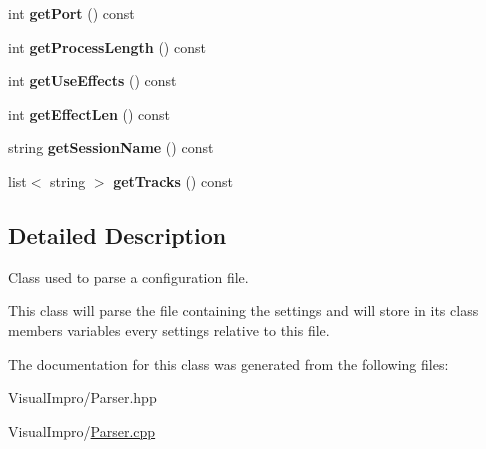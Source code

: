 \begin{DoxyCompactItemize}
int {\bfseries get\+Port} () const
\item 
\mbox{\label{class_parser_a3296d97b8059d1a01ee596f0a3bceaa0}} 
int {\bfseries get\+Process\+Length} () const
\item 
\mbox{\label{class_parser_ad93fcedcca9ed65c9a532da3967524da}} 
int {\bfseries get\+Use\+Effects} () const
\item 
\mbox{\label{class_parser_a01da8b67e24a7ad6c67c4bf25d1b2839}} 
int {\bfseries get\+Effect\+Len} () const
\item 
\mbox{\label{class_parser_a67ce7c654b1fb21ae9288140ec2d6ffc}} 
string {\bfseries get\+Session\+Name} () const
\item 
\mbox{\label{class_parser_a60a3afb113f15d798e604da6752ba1a7}} 
list$<$ string $>$ {\bfseries get\+Tracks} () const
\end{DoxyCompactItemize}


\subsection{Detailed Description}
Class used to parse a configuration file. 

This class will parse the file containing the settings and will store in its class members variables every settings relative to this file. 

The documentation for this class was generated from the following files\+:\begin{DoxyCompactItemize}
\item 
Visual\+Impro/Parser.\+hpp\item 
Visual\+Impro/\mbox{\hyperlink{_parser_8cpp}{Parser.\+cpp}}\end{DoxyCompactItemize}
